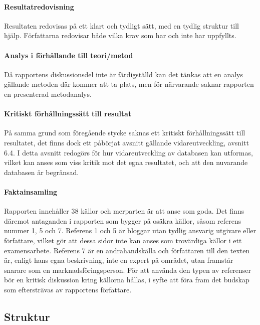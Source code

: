     \paragraph{Resultatredovisning}
        Resultaten redovisas på ett klart och tydligt sätt, med en tydlig struktur till hjälp. Författarna redovisar både vilka krav som har och inte har uppfyllts.

    \paragraph{Analys i förhållande till teori/metod}
        Då rapportens diskussionsdel inte är färdigställd kan det tänkas att en analys gällande metoden där kommer att ta plats, men för närvarande saknar rapporten en presenterad metodanalys.

    \paragraph{Kritiskt förhållningssätt till resultat}
        På samma grund som föregående stycke saknas ett kritiskt förhållningssätt till resultatet, det finns dock ett påbörjat avsnitt gällande vidareutveckling, avsnitt 6.4. I detta avsnitt redogörs för hur vidareutveckling av databasen kan utformas, vilket kan anses som viss kritik mot det egna resultatet, och att den nuvarande databasen är begränsad.

    \paragraph{Faktainsamling}
        Rapporten innehåller 38 källor och merparten är att anse som goda. Det finns däremot antaganden i rapporten som bygger på osäkra källor, såsom referens nummer 1, 5 och 7. Referens 1 och 5 är bloggar utan tydlig ansvarig utgivare eller författare, vilket gör att dessa sidor inte kan anses som trovärdiga källor i ett examensarbete. Referens 7 är en andrahandskälla och författaren till den texten är, enligt hans egna beskrivning, inte en expert på området, utan framstår snarare som en marknadsföringsperson. För att använda den typen av referenser bör en kritisk diskussion kring källorna hållas, i syfte att föra fram det budskap som eftersträvas av rapportens författare.


    \subsection{Struktur} %
    \label{sub:struktur}
